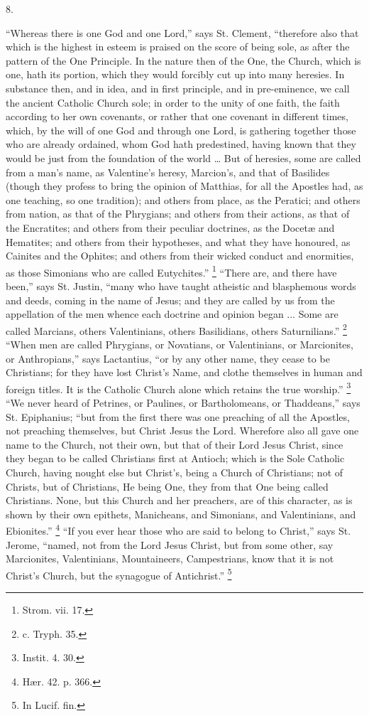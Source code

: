 8.

``Whereas there is one God and one Lord,''
says St. Clement, ``therefore also that which is the
highest in esteem is praised on the score of being sole,
as after the pattern of the One Principle. In the nature
then of the One, the Church, which is one, hath its
portion, which they would forcibly cut up into many
heresies. In substance then, and in idea, and in first
principle, and in pre-eminence, we call the ancient
Catholic Church sole; in order to the unity of one faith,
the faith according to her own covenants, or rather that
one covenant in different times, which, by the will of
one God and through one Lord, is gathering together those
who are already ordained, whom God hath predestined,
having known that they would be just from the foundation
of the world … But of heresies, some are called from
a man's name, as Valentine's heresy, Marcion's, and that
of Basilides (though they profess to bring the opinion of
Matthias, for all the Apostles had, as one teaching, so
one tradition); and others from place, as the Peratici;
and others from nation, as that of the Phrygians; and
others from their actions, as that of the Encratites; and
others from their peculiar doctrines, as the Docetæ and
Hematites; and others from their hypotheses, and what
they have honoured, as Cainites and the Ophites; and
others from their wicked conduct and enormities, as those
Simonians who are called Eutychites.'' \footnote{Strom. vii. 17.}
``There are, and there have been,'' says St.
Justin, ``many who have taught atheistic and
blasphemous words and deeds, coming in the name of Jesus;
and they are called by us from the appellation of the men
whence each doctrine and opinion began ... Some are
called Marcians, others Valentinians, others Basilidians,
others Saturnilians.'' \footnote{c. Tryph. 35.} ``When men are called
Phrygians, or Novatians, or Valentinians, or Marcionites,
or Anthropians,'' says Lactantius, ``or by any
other name, they cease to be Christians; for they have
lost Christ's Name, and clothe themselves in human and
foreign titles. It is the Catholic Church alone which
retains the true worship.'' \footnote{Instit. 4. 30.} ``We never heard of
Petrines, or Paulines, or Bartholomeans, or
Thaddeans,'' says St. Epiphanius; ``but from the
first there was one preaching of all the Apostles, not
preaching themselves, but Christ Jesus the Lord.
Wherefore also all gave one name to the Church, not their
own, but that of their Lord Jesus Christ, since they began to be called Christians first at Antioch; which is
the Sole Catholic Church, having nought else but
Christ's, being a Church of Christians; not of Christs,
but of Christians, He being One, they from that One being
called Christians. None, but this Church and her
preachers, are of this character, as is shown by their
own epithets, Manicheans, and Simonians, and
Valentinians, and Ebionites.'' \footnote{Hær. 42. p. 366.} ``If you ever hear those
who are said to belong to Christ,'' says St. Jerome,
``named, not from the Lord Jesus Christ, but from
some other, say Marcionites, Valentinians, Mountaineers,
Campestrians, know that it is not Christ's Church, but
the synagogue of Antichrist.'' \footnote{In Lucif. fin.}

